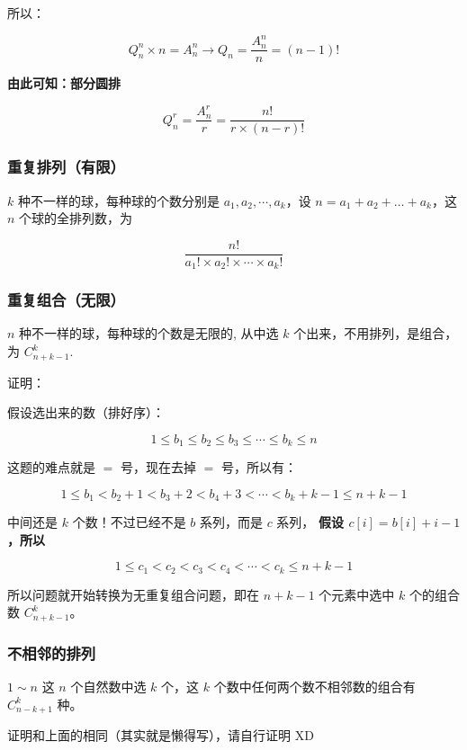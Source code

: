 所以：

$$
Q_n^n \times n = A_n^n → Q_n = \frac{A_n^n}{n} = (n-1)!
$$

\textbf{ 由此可知：部分圆排 }

$$
Q_n^r = \frac{A_n^r}{r} = \frac{n!}{r \times (n-r)!}
$$

\subsubsection{重复排列（有限）}

$k$ 种不一样的球，每种球的个数分别是 $a_1,a_2,\cdots,a_k$，设 $n=a_1+a_2+…+a_k$，这 $n$ 个球的全排列数，为

$$
\frac{n!}{a_1! \times a_2! \times \cdots \times a_k!}
$$

\subsubsection{重复组合（无限）}

$n$ 种不一样的球，每种球的个数是无限的, 从中选 $k$ 个出来，不用排列，是组合，为 $C_{n+k-1}^{k}$.

证明：

\begin{QUOTE}{}{}
假设选出来的数（排好序）：
\end{QUOTE}

$$
1 \le b_1 \le b_2 \le b_3 \le \cdots \le b_k \le n
$$

\begin{QUOTE}{}{}
这题的难点就是 $=$ 号，现在去掉 $=$ 号，所以有：
\end{QUOTE}

$$
1 \le b_1 < b_2+1 < b_3+2 < b_4+3 < \cdots < b_k+k-1 \le n+k-1
$$

中间还是 $k$ 个数！不过已经不是 $b$ 系列，而是 $c$ 系列，\textbf{ 假设 $c[i]=b[i]+i-1$，所以 }

$$
1 \le c_1 < c_2 < c_3 < c_4 < \cdots < c_k \le n+k-1
$$

所以问题就开始转换为无重复组合问题，即在 $n+k-1$ 个元素中选中 $k$ 个的组合数 $C_{n+k-1}^{k}$。

\subsubsection{不相邻的排列}

$1 \sim n$ 这 $n$ 个自然数中选 $k$ 个，这 $k$ 个数中任何两个数不相邻数的组合有 $C_{n-k+1}^{k}$ 种。

证明和上面的相同（其实就是懒得写），请自行证明 XD

